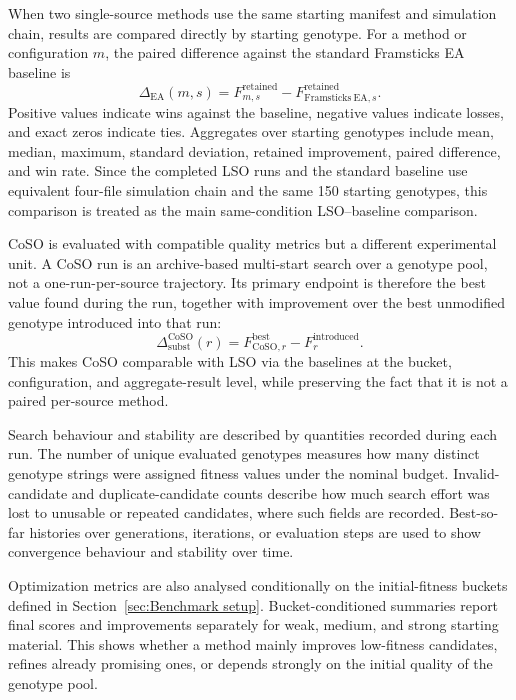 When two single-source methods use the same starting manifest and simulation chain, results are compared directly by starting genotype. For a method or configuration \(m\), the paired difference against the standard Framsticks EA baseline is
\[
\Delta_{\mathrm{EA}}(m,s)
= F^{\mathrm{retained}}_{m,s}
- F^{\mathrm{retained}}_{\mathrm{Framsticks\ EA},s}.
\]
Positive values indicate wins against the baseline, negative values indicate losses, and exact zeros indicate ties. Aggregates over starting genotypes include mean, median, maximum, standard deviation, retained improvement, paired difference, and win rate. Since the completed LSO runs and the standard baseline use equivalent four-file simulation chain and the same 150 starting genotypes, this comparison is treated as the main same-condition LSO--baseline comparison.

CoSO is evaluated with compatible quality metrics but a different experimental unit. A CoSO run is an archive-based multi-start search over a genotype pool, not a one-run-per-source trajectory. Its primary endpoint is therefore the best \vertpos{} value found during the run, together with improvement over the best unmodified genotype introduced into that run:
\[
\Delta^{\mathrm{CoSO}}_{\mathrm{subst}}(r)
= F^{\mathrm{best}}_{\mathrm{CoSO},r}
- F^{\mathrm{introduced}}_{r}.
\]
This makes CoSO comparable with LSO via the baselines at the bucket, configuration, and aggregate-result level, while preserving the fact that it is not a paired per-source method.

Search behaviour and stability are described by quantities recorded during each run. The number of unique evaluated genotypes measures how many distinct genotype strings were assigned fitness values under the nominal budget. Invalid-candidate and duplicate-candidate counts describe how much search effort was lost to unusable or repeated candidates, where such fields are recorded. Best-so-far histories over generations, iterations, or evaluation steps are used to show convergence behaviour and stability over time.

Optimization metrics are also analysed conditionally on the initial-fitness buckets defined in Section~\ref{sec:Benchmark setup}. Bucket-conditioned summaries report final scores and improvements separately for weak, medium, and strong starting material. This shows whether a method mainly improves low-fitness candidates, refines already promising ones, or depends strongly on the initial quality of the genotype pool.


